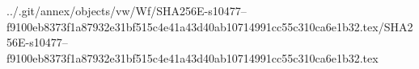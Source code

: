 ../.git/annex/objects/vw/Wf/SHA256E-s10477--f9100eb8373f1a87932e31bf515c4e41a43d40ab10714991cc55c310ca6e1b32.tex/SHA256E-s10477--f9100eb8373f1a87932e31bf515c4e41a43d40ab10714991cc55c310ca6e1b32.tex